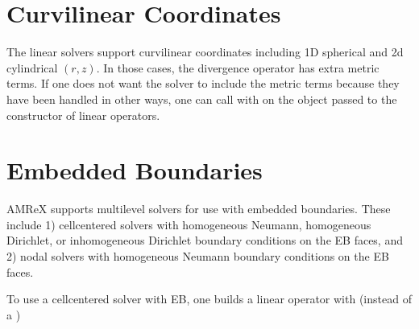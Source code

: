 \documentclass[letterpaper,10pt,english]{sphinxmanual}
\begin{document}
\section{Curvilinear Coordinates}
\label{\detokenize{LinearSolvers:curvilinear-coordinates}}
\sphinxAtStartPar
The linear solvers support curvilinear coordinates including 1D
spherical and 2d cylindrical \((r,z)\).  In those cases, the
divergence operator has extra metric terms.  If one does not want the
solver to include the metric terms because they have been handled in
other ways, one can call  with 
on the  object passed to the constructor of linear
operators.


\section{Embedded Boundaries}
\label{\detokenize{LinearSolvers:embedded-boundaries}}
\sphinxAtStartPar
AMReX supports multi\sphinxhyphen{}level solvers for use with embedded boundaries.
These include
1) cell\sphinxhyphen{}centered solvers with homogeneous Neumann, homogeneous Dirichlet,
or inhomogeneous Dirichlet boundary conditions on the EB faces, and
2) nodal solvers with homogeneous Neumann boundary conditions on the EB faces.

\sphinxAtStartPar
To use a cell\sphinxhyphen{}centered solver with EB, one builds a linear operator
 with  (instead of a )

\begin{sphinxVerbatim}[commandchars=\\\{\}]
   
               
               
               
                
\end{sphinxVerbatim}
\end{document}
